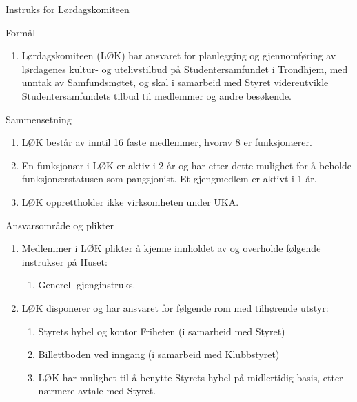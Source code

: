 
\begin{instruks}{Instruks for Lørdagskomiteen}{ }{ }

    \begin{instruksledd}{Formål}
        \begin{enumerate}
            \item Lørdagskomiteen (LØK) har ansvaret for planlegging og gjennomføring av lørdagenes
                kultur- og
                utelivstilbud på Studentersamfundet i Trondhjem, med unntak av Samfundsmøtet, og skal i samarbeid
                med
                Styret videreutvikle Studentersamfundets tilbud til medlemmer og andre besøkende.
        \end{enumerate}
    \end{instruksledd}

    \begin{instruksledd}{Sammensetning}
        \begin{enumerate}
            \item LØK består av inntil 16 faste medlemmer, hvorav 8 er funksjonærer.
            \item En funksjonær i LØK er aktiv i 2 år og har etter dette mulighet for å beholde
                funksjonærstatusen som
                pangsjonist. Et gjengmedlem er aktivt i 1 år.
            \item LØK opprettholder ikke virksomheten under UKA.
        \end{enumerate}
    \end{instruksledd}

    \begin{instruksledd}{Ansvarsområde og plikter}
        \begin{enumerate}
            \item  Medlemmer i LØK plikter å kjenne innholdet av og overholde følgende instrukser på
                Huset:
                \begin{enumerate}
                    \item Generell gjenginstruks.
                \end{enumerate}
            \item LØK disponerer og har ansvaret for følgende rom med tilhørende utstyr:
                \begin{enumerate}
                    \item Styrets hybel og kontor Friheten (i samarbeid med Styret)
                    \item Billettboden ved inngang (i samarbeid med Klubbstyret)
                    \item LØK har mulighet til å benytte Styrets hybel på midlertidig basis, etter
                        nærmere avtale med Styret.
                \end{enumerate}
        \end{enumerate}
    \end{instruksledd}


\end{instruks}
